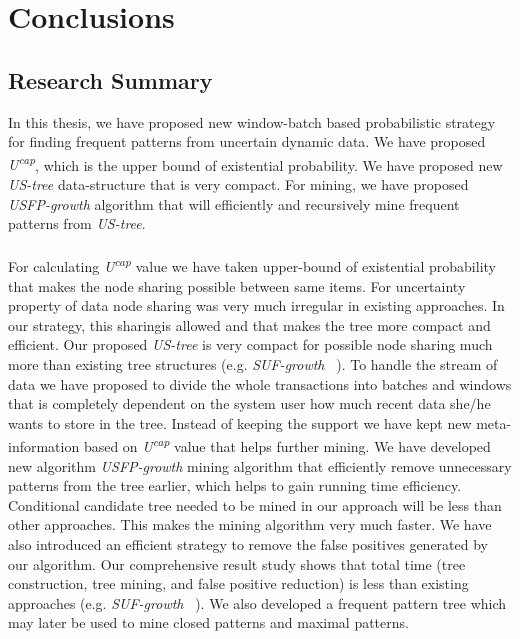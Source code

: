 \chapter{Conclusions}
\section{Research Summary}
In this thesis, we have proposed new window-batch based probabilistic strategy for finding frequent patterns from uncertain dynamic data. We have proposed \emph{U\textsuperscript{cap}}, which is the upper bound of existential probability. We have proposed new \emph{US-tree} data-structure that is very compact. For mining, we have proposed \emph{USFP-growth} algorithm that will efficiently and recursively mine frequent patterns from \emph{US-tree}.\\
\\
For calculating \emph{U\textsuperscript{cap}} value we have taken upper-bound of existential probability that makes the node sharing possible between same items. For uncertainty property of data node sharing was very much irregular in existing approaches. In our strategy, this sharingis allowed and that makes the tree more compact and efficient. Our proposed \emph{US-tree} is very compact for possible node sharing much more than existing tree structures (e.g. \emph{SUF-growth} ~\cite{suf_growth}). To handle the stream of data we have proposed to divide the whole transactions into batches and windows that is completely dependent on the system user how much recent data she/he wants to store in the tree. Instead of keeping the support we have kept new meta-information based on \emph{U\textsuperscript{cap}} value that helps further mining. We have developed new algorithm \emph{USFP-growth} mining algorithm that efficiently remove unnecessary patterns from the tree earlier, which helps to gain running time efficiency. Conditional candidate tree needed to be mined in our approach will be less than other approaches. This makes the mining algorithm very much faster. We have also introduced an efficient strategy to remove the false positives generated by our algorithm. Our comprehensive result study shows that total time (tree construction, tree mining, and false positive reduction) is less than existing approaches (e.g. \emph{SUF-growth} ~\cite{suf_growth}). We also developed a frequent pattern tree which may later be used to mine closed patterns and maximal patterns.
